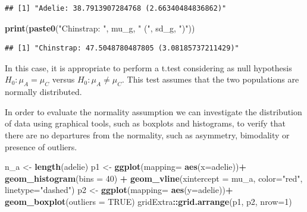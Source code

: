 \documentclass[
]{article}
\newenvironment{Shaded}{\begin{snugshade}}{\end{snugshade}}
\newcommand{\AttributeTok}[1]{\textcolor[rgb]{0.13,0.29,0.53}{#1}}
\newcommand{\ConstantTok}[1]{\textcolor[rgb]{0.56,0.35,0.01}{#1}}
\newcommand{\DecValTok}[1]{\textcolor[rgb]{0.00,0.00,0.81}{#1}}
\newcommand{\FunctionTok}[1]{\textcolor[rgb]{0.13,0.29,0.53}{\textbf{#1}}}
\newcommand{\NormalTok}[1]{#1}
\newcommand{\OtherTok}[1]{\textcolor[rgb]{0.56,0.35,0.01}{#1}}
\newcommand{\SpecialCharTok}[1]{\textcolor[rgb]{0.81,0.36,0.00}{\textbf{#1}}}
\newcommand{\StringTok}[1]{\textcolor[rgb]{0.31,0.60,0.02}{#1}}
\begin{document}
\begin{verbatim}
## [1] "Adelie: 38.7913907284768 (2.66340484836862)"
\end{verbatim}

\begin{Shaded}
\begin{Highlighting}[]
\FunctionTok{print}\NormalTok{(}\FunctionTok{paste0}\NormalTok{(}\StringTok{"Chinstrap: "}\NormalTok{, mu\_g, }\StringTok{" ("}\NormalTok{, sd\_g, }\StringTok{")"}\NormalTok{))}
\end{Highlighting}
\end{Shaded}

\begin{verbatim}
## [1] "Chinstrap: 47.5048780487805 (3.08185737211429)"
\end{verbatim}

In this case, it is appropriate to perform a t.test considering as null
hypothesis \(H_0: \mu_A = \mu_C\) versus \(H_0: \mu_A \not= \mu_C\).
This test assumes that the two populations are normally distributed.

\begin{Shaded}
\end{Shaded}

In order to evaluate the normality assumption we can investigate the
distribution of data using graphical tools, such as boxplots and
histograms, to verify that there are no departures from the normality,
such as asymmetry, bimodality or presence of outliers.

\begin{Shaded}
\begin{Highlighting}[]
\NormalTok{n\_a }\OtherTok{\textless{}{-}} \FunctionTok{length}\NormalTok{(adelie)}
\NormalTok{p1 }\OtherTok{\textless{}{-}} \FunctionTok{ggplot}\NormalTok{(}\AttributeTok{mapping=} \FunctionTok{aes}\NormalTok{(}\AttributeTok{x=}\NormalTok{adelie))}\SpecialCharTok{+}
  \FunctionTok{geom\_histogram}\NormalTok{(}\AttributeTok{bins =} \DecValTok{40}\NormalTok{) }\SpecialCharTok{+} 
  \FunctionTok{geom\_vline}\NormalTok{(}\AttributeTok{xintercept =}\NormalTok{ mu\_a, }\AttributeTok{color=}\StringTok{"red"}\NormalTok{, }\AttributeTok{linetype=}\StringTok{"dashed"}\NormalTok{)}
\NormalTok{p2 }\OtherTok{\textless{}{-}} \FunctionTok{ggplot}\NormalTok{(}\AttributeTok{mapping=} \FunctionTok{aes}\NormalTok{(}\AttributeTok{y=}\NormalTok{adelie))}\SpecialCharTok{+}
  \FunctionTok{geom\_boxplot}\NormalTok{(}\AttributeTok{outliers =} \ConstantTok{TRUE}\NormalTok{)}
\NormalTok{gridExtra}\SpecialCharTok{::}\FunctionTok{grid.arrange}\NormalTok{(p1, p2, }\AttributeTok{nrow=}\DecValTok{1}\NormalTok{)}
\end{Highlighting}
\end{Shaded}
\end{document}
